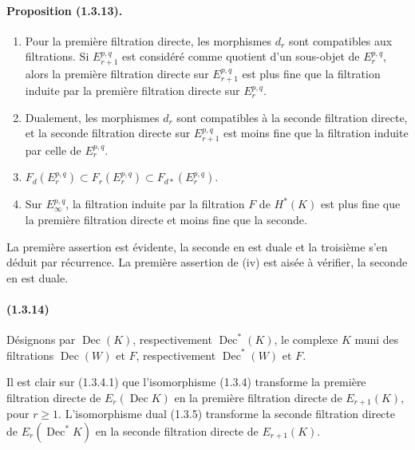 \documentclass[10pt]{article}
\newcommand{\Dec}{\operatorname{Dec}}
\begin{document}
\paragraph{Proposition (1.3.13).}
\begin{enumerate}[label=(\roman*)]
\item Pour la première filtration directe, les morphismes $d_r$ sont compatibles aux filtrations. Si $E_{r+1}^{p,q}$ est considéré comme quotient d'un sous-objet de $E_r^{p,q}$, alors la première filtration directe sur $E_{r+1}^{p,q}$ est plus fine que la filtration induite par la première filtration directe sur $E_r^{p,q}$.
\item Dualement, les morphismes $d_r$ sont compatibles à la seconde filtration directe, et la seconde filtration directe sur $E_{r+1}^{p,q}$ est moins fine que la filtration induite par celle de $E_r^{p,q}$.
\item $F_d(E_r^{p,q})\subset F_r(E_r^{p,q})\subset F_{d*}(E_r^{p,q})$.
\item Sur $E_\infty^{p,q}$, la filtration induite par la filtration $F$ de $H^*(K)$ est plus fine que la première filtration directe et moins fine que la seconde.
\end{enumerate}
La première assertion est évidente, la seconde en est duale et la troisième s'en déduit par récurrence. La première assertion de (iv) est aisée à vérifier, la seconde en est duale.

\paragraph{(1.3.14)} Désignons par $\Dec(K)$, respectivement $\Dec^*(K)$, le complexe $K$ muni des filtrations $\Dec(W)$ et $F$, respectivement $\Dec^*(W)$ et $F$.

Il est clair sur (1.3.4.1) que l'isomorphisme (1.3.4) transforme la première filtration directe de $E_r(\Dec K)$ en la première filtration directe de $E_{r+1}(K)$, pour $r\ge1$. L'isomorphisme dual (1.3.5) transforme la seconde filtration directe de $E_r(\Dec^*K)$ en la seconde filtration directe de $E_{r+1}(K)$.
\end{document}
